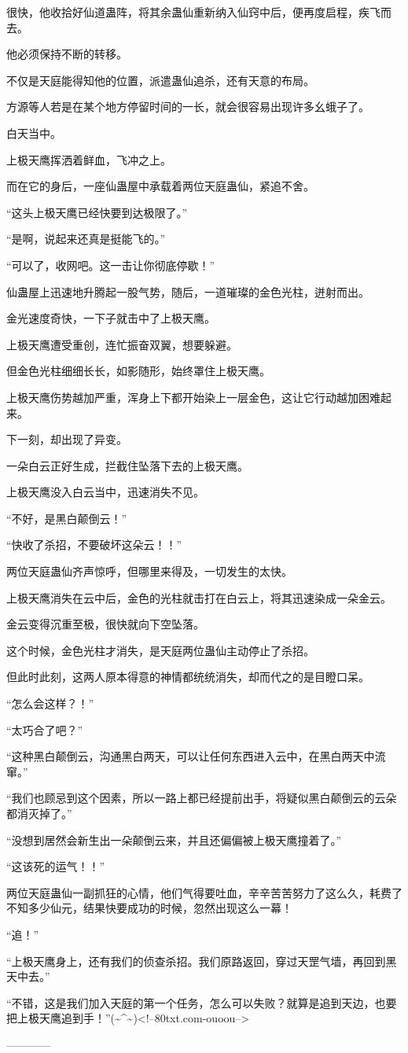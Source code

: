 \begin{this_body}
很快，他收拾好仙道蛊阵，将其余蛊仙重新纳入仙窍中后，便再度启程，疾飞而去。

他必须保持不断的转移。

不仅是天庭能得知他的位置，派遣蛊仙追杀，还有天意的布局。

方源等人若是在某个地方停留时间的一长，就会很容易出现许多幺蛾子了。

白天当中。

上极天鹰挥洒着鲜血，飞冲之上。

而在它的身后，一座仙蛊屋中承载着两位天庭蛊仙，紧追不舍。

“这头上极天鹰已经快要到达极限了。”

“是啊，说起来还真是挺能飞的。”

“可以了，收网吧。这一击让你彻底停歇！”

仙蛊屋上迅速地升腾起一股气势，随后，一道璀璨的金色光柱，迸射而出。

金光速度奇快，一下子就击中了上极天鹰。

上极天鹰遭受重创，连忙振奋双翼，想要躲避。

但金色光柱细细长长，如影随形，始终罩住上极天鹰。

上极天鹰伤势越加严重，浑身上下都开始染上一层金色，这让它行动越加困难起来。

下一刻，却出现了异变。

一朵白云正好生成，拦截住坠落下去的上极天鹰。

上极天鹰没入白云当中，迅速消失不见。

“不好，是黑白颠倒云！”

“快收了杀招，不要破坏这朵云！！”

两位天庭蛊仙齐声惊呼，但哪里来得及，一切发生的太快。

上极天鹰消失在云中后，金色的光柱就击打在白云上，将其迅速染成一朵金云。

金云变得沉重至极，很快就向下空坠落。

这个时候，金色光柱才消失，是天庭两位蛊仙主动停止了杀招。

但此时此刻，这两人原本得意的神情都统统消失，却而代之的是目瞪口呆。

“怎么会这样？！”

“太巧合了吧？”

“这种黑白颠倒云，沟通黑白两天，可以让任何东西进入云中，在黑白两天中流窜。”

“我们也顾忌到这个因素，所以一路上都已经提前出手，将疑似黑白颠倒云的云朵都消灭掉了。”

“没想到居然会新生出一朵颠倒云来，并且还偏偏被上极天鹰撞着了。”

“这该死的运气！！”

两位天庭蛊仙一副抓狂的心情，他们气得要吐血，辛辛苦苦努力了这么久，耗费了不知多少仙元，结果快要成功的时候，忽然出现这么一幕！

“追！”

“上极天鹰身上，还有我们的侦查杀招。我们原路返回，穿过天罡气墙，再回到黑天中去。”

“不错，这是我们加入天庭的第一个任务，怎么可以失败？就算是追到天边，也要把上极天鹰追到手！”(\~{}\^{}\~{})<!--80txt.com-ouoou-->

------------

\end{this_body}

